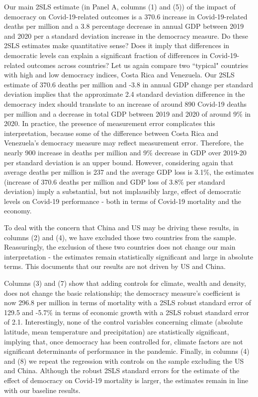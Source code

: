 Our main 2SLS estimate (in Panel A, columns (1) and (5)) of the impact of democracy on Covid-19-related outcomes is a 370.6 increase in Covid-19-related deaths per million and a 3.8 percentage decrease in annual GDP between 2019 and 2020 per a standard deviation increase in the democracy measure. 
Do these 2SLS estimates make quantitative sense? Does it imply that differences in democratic levels can explain a significant fraction of differences in Covid-19-related outcomes across countries? Let us again compare two ``typical" countries with high and low democracy indices, Costa Rica and Venezuela. Our 2SLS estimate of 370.6 deaths per million and -3.8 in annual GDP change per standard deviation implies that the approximate 2.4 standard deviation difference in the democracy index should translate to an increase of around 890 Covid-19 deaths per million and a decrease in total GDP between 2019 and 2020 of around 9\% in 2020. In practice, the presence of measurement error complicates this interpretation, because some of the difference between Costa Rica and Venezuela's democracy measure may reflect measurement error. Therefore, the nearly 900 increase in deaths per million and 9\% decrease in GDP over 2019-20 per standard deviation is an upper bound. However, considering again that average deaths per million is 237 and the average GDP loss is 3.1\%, the estimates (increase of 370.6 deaths per million and GDP loss of 3.8\% per standard deviation) imply a substantial, but not implausibly large, effect of democratic levels on Covid-19 performance - both in terms of Covid-19 mortality and the economy. 
    
To deal with the concern that China and US may be driving these results, in columns (2) and (4), we have excluded those two countries from the sample. Reassuringly, the exclusion of these two countries does not change our main interpretation  - the estimates remain statistically significant and large in absolute terms. This documents that our results are not driven by US and China.
    
Columns (3) and (7) show that adding controls for climate, wealth and density, does not change the basic relationship; the democracy measure's coefficient is now 296.8 per million in terms of mortality with a 2SLS robust standard error of 129.5 and -5.7\% in terms of economic growth with a 2SLS robust standard error of 2.1. Interestingly, none of the control variables concerning climate (absolute latitude, mean temperature and precipitation) are statistically significant, implying that, once democracy has been controlled for, climate factors are not significant determinants of performance in the pandemic. Finally, in columns (4) and (8) we repeat the regression with controls on the sample excluding the US and China. Although the robust 2SLS standard errors for the estimate of the effect of democracy on Covid-19 mortality is larger, the estimates remain in line with our baseline results.  

